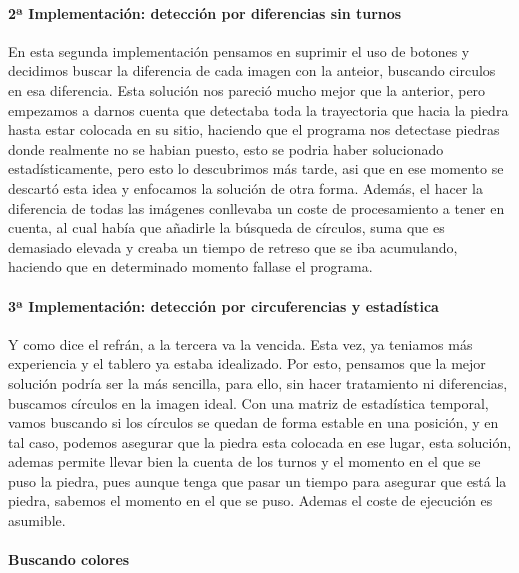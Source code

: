 \documentclass[12pt,a4paper]{report}
\begin{document}
\paragraph{2ª Implementación: detección por diferencias sin turnos}
En esta segunda implementación pensamos en suprimir el uso de botones y
decidimos buscar la diferencia de cada imagen con la anteior, buscando circulos
en esa diferencia. Esta solución nos pareció mucho mejor que la anterior, pero
empezamos a darnos cuenta que detectaba toda la trayectoria que hacia la piedra
hasta estar colocada en su sitio, haciendo que el programa nos detectase piedras
donde realmente no se habian puesto, esto se podria haber solucionado
estadísticamente, pero esto lo descubrimos más tarde, asi que en ese momento se
descartó esta idea y enfocamos la solución de otra forma. Además, el hacer la
diferencia de todas las imágenes conllevaba un coste de procesamiento a tener en
cuenta, al cual había que añadirle la búsqueda de círculos, suma que es
demasiado elevada y creaba un tiempo de retreso que se iba acumulando, haciendo
que en determinado momento fallase el programa.

\paragraph{3ª Implementación: detección por circuferencias y estadística}
Y como dice el refrán, a la tercera va la vencida. Esta vez, ya teniamos más
experiencia y el tablero ya estaba idealizado. Por esto, pensamos que la mejor
solución podría ser la más sencilla, para ello, sin hacer tratamiento ni
diferencias, buscamos círculos en la imagen ideal. Con una matriz de estadística
temporal, vamos buscando si los círculos se quedan de forma estable en una
posición, y en tal caso, podemos asegurar que la piedra esta colocada en ese
lugar, esta solución, ademas permite llevar bien la cuenta de los turnos y el
momento en el que se puso la piedra, pues aunque tenga que pasar un tiempo para
asegurar que está la piedra, sabemos el momento en el que se puso. Ademas el
coste de ejecución es asumible.

\paragraph{Buscando colores}
\end{document}
